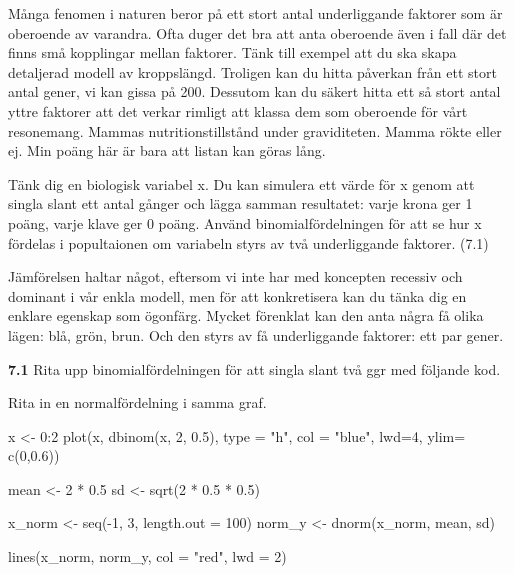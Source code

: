 \documentclass[
  letterpaper,
  DIV=11,
  numbers=noendperiod]{scrartcl}
\newenvironment{Shaded}{\begin{snugshade}}{\end{snugshade}}
\newcommand{\AttributeTok}[1]{\textcolor[rgb]{0.40,0.45,0.13}{#1}}
\newcommand{\DecValTok}[1]{\textcolor[rgb]{0.68,0.00,0.00}{#1}}
\newcommand{\FloatTok}[1]{\textcolor[rgb]{0.68,0.00,0.00}{#1}}
\newcommand{\FunctionTok}[1]{\textcolor[rgb]{0.28,0.35,0.67}{#1}}
\newcommand{\NormalTok}[1]{\textcolor[rgb]{0.00,0.23,0.31}{#1}}
\newcommand{\OtherTok}[1]{\textcolor[rgb]{0.00,0.23,0.31}{#1}}
\newcommand{\SpecialCharTok}[1]{\textcolor[rgb]{0.37,0.37,0.37}{#1}}
\newcommand{\StringTok}[1]{\textcolor[rgb]{0.13,0.47,0.30}{#1}}
\begin{document}
Många fenomen i naturen beror på ett stort antal underliggande faktorer
som är oberoende av varandra. Ofta duger det bra att anta oberoende även
i fall där det finns små kopplingar mellan faktorer. Tänk till exempel
att du ska skapa detaljerad modell av kroppslängd. Troligen kan du hitta
påverkan från ett stort antal gener, vi kan gissa på 200. Dessutom kan
du säkert hitta ett så stort antal yttre faktorer att det verkar rimligt
att klassa dem som oberoende för vårt resonemang. Mammas
nutritionstillstånd under graviditeten. Mamma rökte eller ej. Min poäng
här är bara att listan kan göras lång.

Tänk dig en biologisk variabel x. Du kan simulera ett värde för x genom
att singla slant ett antal gånger och lägga samman resultatet: varje
krona ger 1 poäng, varje klave ger 0 poäng. Använd binomialfördelningen
för att se hur x fördelas i popultaionen om variabeln styrs av två
underliggande faktorer. (7.1)

Jämförelsen haltar något, eftersom vi inte har med koncepten recessiv
och dominant i vår enkla modell, men för att konkretisera kan du tänka
dig en enklare egenskap som ögonfärg. Mycket förenklat kan den anta
några få olika lägen: blå, grön, brun. Och den styrs av få underliggande
faktorer: ett par gener.

\textbf{7.1} Rita upp binomialfördelningen för att singla slant två ggr
med följande kod.

Rita in en normalfördelning i samma graf.

\begin{Shaded}
\begin{Highlighting}[]
\NormalTok{x }\OtherTok{\textless{}{-}} \DecValTok{0}\SpecialCharTok{:}\DecValTok{2}
\FunctionTok{plot}\NormalTok{(x, }\FunctionTok{dbinom}\NormalTok{(x, }\DecValTok{2}\NormalTok{, }\FloatTok{0.5}\NormalTok{), }\AttributeTok{type =} \StringTok{"h"}\NormalTok{, }\AttributeTok{col =} \StringTok{"blue"}\NormalTok{, }\AttributeTok{lwd=}\DecValTok{4}\NormalTok{, }\AttributeTok{ylim=} \FunctionTok{c}\NormalTok{(}\DecValTok{0}\NormalTok{,}\FloatTok{0.6}\NormalTok{))}

\NormalTok{mean }\OtherTok{\textless{}{-}} \DecValTok{2} \SpecialCharTok{*} \FloatTok{0.5}
\NormalTok{sd }\OtherTok{\textless{}{-}} \FunctionTok{sqrt}\NormalTok{(}\DecValTok{2} \SpecialCharTok{*} \FloatTok{0.5} \SpecialCharTok{*} \FloatTok{0.5}\NormalTok{)}

\NormalTok{x\_norm }\OtherTok{\textless{}{-}} \FunctionTok{seq}\NormalTok{(}\SpecialCharTok{{-}}\DecValTok{1}\NormalTok{, }\DecValTok{3}\NormalTok{, }\AttributeTok{length.out =} \DecValTok{100}\NormalTok{)}
\NormalTok{norm\_y }\OtherTok{\textless{}{-}} \FunctionTok{dnorm}\NormalTok{(x\_norm, mean, sd)}

\FunctionTok{lines}\NormalTok{(x\_norm, norm\_y, }\AttributeTok{col =} \StringTok{"red"}\NormalTok{, }\AttributeTok{lwd =} \DecValTok{2}\NormalTok{)}
\end{Highlighting}
\end{Shaded}
\end{document}
